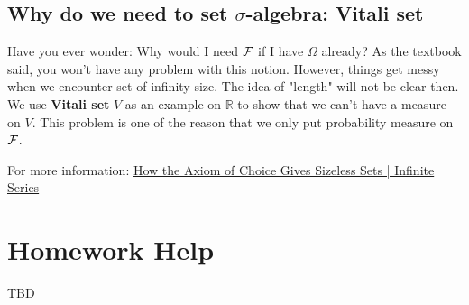 \subsection{Why do we need to set \(\sigma\)-algebra: Vitali set}
Have you ever wonder: Why would I need \(\mathcal{\MakeUppercase{f}} \) if I have \(\Omega\) already? As the textbook said, you won't have any problem with this notion. 
However, things get messy when we encounter set of infinity size. The idea of "length" will not be clear then. 
We use \textbf{Vitali set} \(V\) as an example on \(\mathbb{R}\) to show that we can't have a measure on  \(V\).
This problem is one of the reason that we only put probability measure on \(\mathcal{\MakeUppercase{f}} \).  
	

For more information:
\href{https://youtu.be/hcRZadc5KpI}{How the Axiom of Choice Gives Sizeless Sets | Infinite Series}

\section{Homework Help}
TBD